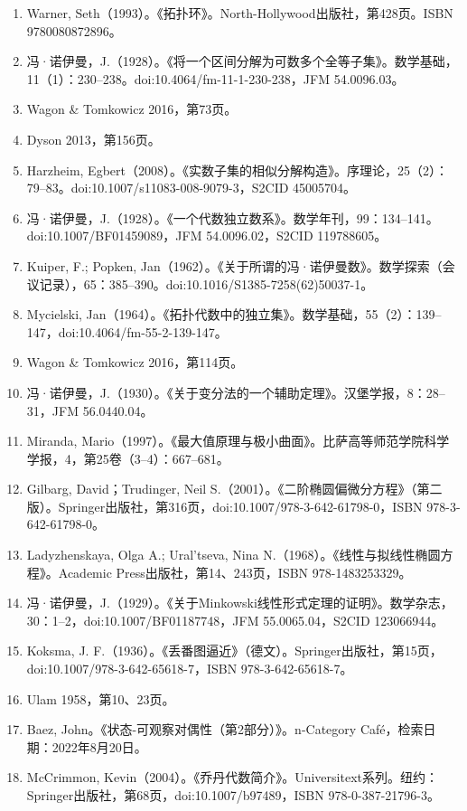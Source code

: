 \begin{enumerate}
\item Warner, Seth（1993）。《拓扑环》。North-Hollywood出版社，第428页。ISBN 9780080872896。  
\item 冯·诺伊曼，J.（1928）。《将一个区间分解为可数多个全等子集》。数学基础，11（1）：230–238。doi:10.4064/fm-11-1-230-238，JFM 54.0096.03。  
\item Wagon & Tomkowicz 2016，第73页。  
\item Dyson 2013，第156页。  
\item Harzheim, Egbert（2008）。《实数子集的相似分解构造》。序理论，25（2）：79–83。doi:10.1007/s11083-008-9079-3，S2CID 45005704。  
\item 冯·诺伊曼，J.（1928）。《一个代数独立数系》。数学年刊，99：134–141。doi:10.1007/BF01459089，JFM 54.0096.02，S2CID 119788605。  
\item Kuiper, F.; Popken, Jan（1962）。《关于所谓的冯·诺伊曼数》。数学探索（会议记录），65：385–390。doi:10.1016/S1385-7258(62)50037-1。
\item Mycielski, Jan（1964）。《拓扑代数中的独立集》。数学基础，55（2）：139–147，doi:10.4064/fm-55-2-139-147。  
\item Wagon & Tomkowicz 2016，第114页。  
\item 冯·诺伊曼，J.（1930）。《关于变分法的一个辅助定理》。汉堡学报，8：28–31，JFM 56.0440.04。  
\item Miranda, Mario（1997）。《最大值原理与极小曲面》。比萨高等师范学院科学学报，4，第25卷（3–4）：667–681。  
\item Gilbarg, David；Trudinger, Neil S.（2001）。《二阶椭圆偏微分方程》（第二版）。Springer出版社，第316页，doi:10.1007/978-3-642-61798-0，ISBN 978-3-642-61798-0。  
\item Ladyzhenskaya, Olga A.; Ural'tseva, Nina N.（1968）。《线性与拟线性椭圆方程》。Academic Press出版社，第14、243页，ISBN 978-1483253329。  
\item 冯·诺伊曼，J.（1929）。《关于Minkowski线性形式定理的证明》。数学杂志，30：1–2，doi:10.1007/BF01187748，JFM 55.0065.04，S2CID 123066944。  
\item Koksma, J. F.（1936）。《丢番图逼近》（德文）。Springer出版社，第15页，doi:10.1007/978-3-642-65618-7，ISBN 978-3-642-65618-7。  
\item Ulam 1958，第10、23页。  
\item Baez, John。《状态-可观察对偶性（第2部分）》。n-Category Café，检索日期：2022年8月20日。  
\item McCrimmon, Kevin（2004）。《乔丹代数简介》。Universitext系列。纽约：Springer出版社，第68页，doi:10.1007/b97489，ISBN 978-0-387-21796-3。  

\end{enumerate}
